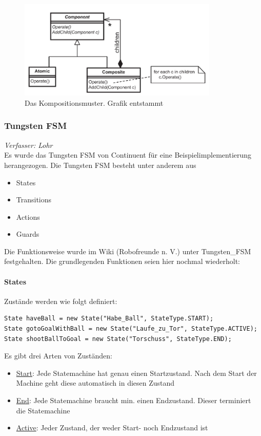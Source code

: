 \documentclass[fontsize=12pt,a4paper,final]{scrartcl}[2003/01/01]
\begin{document}
\begin{figure}[ht]
	\centering
  \includegraphics[width=0.85\textwidth]{Grafiken/KI/goal-driven.png}
	\caption{Das Kompositionsmuster. Grafik entstammt \cite[S. 383]{buckland2005programming}}
	\label{fig2}
\end{figure}

\subsubsection{Tungsten FSM}
\textit{Verfasser: Lohr}\\
Es wurde das Tungsten FSM von Continuent für eine Beispielimplementierung herangezogen. Die Tungsten FSM besteht unter anderem aus
\begin{itemize}
 \item States
 \item Transitions
 \item Actions
 \item Guards
\end{itemize}
Die Funktionsweise wurde im Wiki (Robofreunde n. V.) unter Tungsten\_FSM festgehalten. Die grundlegenden Funktionen seien hier nochmal wiederholt:

\paragraph{States}
Zustände werden wie folgt definiert:
\begin{lstlisting}
State haveBall = new State("Habe_Ball", StateType.START);
State gotoGoalWithBall = new State("Laufe_zu_Tor", StateType.ACTIVE);
State shootBallToGoal = new State("Torschuss", StateType.END);
\end{lstlisting}
Es gibt drei Arten von Zuständen:
\begin{itemize}
 \item \underline{Start}: Jede Statemachine hat genau einen Startzustand. Nach dem Start der Machine geht diese automatisch in diesen Zustand
 \item \underline{End}: Jede Statemachine braucht min. einen Endzustand. Dieser terminiert die Statemachine
 \item \underline{Active}: Jeder Zustand, der weder Start- noch Endzustand ist
\end{itemize}
\end{document}
